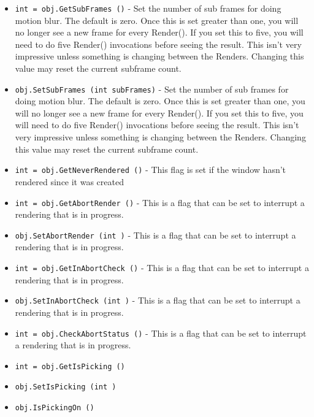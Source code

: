 \begin{itemize}
\item  \verb|int = obj.GetSubFrames ()| -  Set the number of sub frames for doing motion blur. The default is zero.
 Once this is set greater than one, you will no longer see a new frame
 for every Render().  If you set this to five, you will need to do
 five Render() invocations before seeing the result. This isn't
 very impressive unless something is changing between the Renders.
 Changing this value may reset the current subframe count.

\item  \verb|obj.SetSubFrames (int subFrames)| -  Set the number of sub frames for doing motion blur. The default is zero.
 Once this is set greater than one, you will no longer see a new frame
 for every Render().  If you set this to five, you will need to do
 five Render() invocations before seeing the result. This isn't
 very impressive unless something is changing between the Renders.
 Changing this value may reset the current subframe count.

\item  \verb|int = obj.GetNeverRendered ()| -  This flag is set if the window hasn't rendered since it was created

\item  \verb|int = obj.GetAbortRender ()| -  This is a flag that can be set to interrupt a rendering that is in
 progress.

\item  \verb|obj.SetAbortRender (int )| -  This is a flag that can be set to interrupt a rendering that is in
 progress.

\item  \verb|int = obj.GetInAbortCheck ()| -  This is a flag that can be set to interrupt a rendering that is in
 progress.

\item  \verb|obj.SetInAbortCheck (int )| -  This is a flag that can be set to interrupt a rendering that is in
 progress.

\item  \verb|int = obj.CheckAbortStatus ()| -  This is a flag that can be set to interrupt a rendering that is in
 progress.

\item  \verb|int = obj.GetIsPicking ()|

\item  \verb|obj.SetIsPicking (int )|

\item  \verb|obj.IsPickingOn ()|


\end{itemize}
